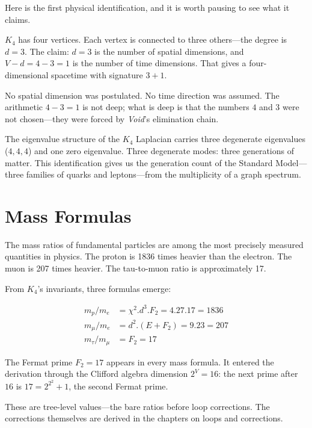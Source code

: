 \documentclass[11pt,a4paper]{book}
\def\cdot{.}%
\newcommand{\VoidRef}[2]{\textit{#2} (in \textit{Void})}
\begin{document}
Here is the first physical identification, and it is worth pausing to see what it claims.

$K_4$ has four vertices. Each vertex is connected to three others---the degree is $d = 3$. The claim: $d = 3$ is the number of spatial dimensions, and $V - d = 4 - 3 = 1$ is the number of time dimensions. That gives a four-dimensional spacetime with signature $3 + 1$.

No spatial dimension was postulated. No time direction was assumed. The arithmetic $4 - 3 = 1$ is not deep; what is deep is that the numbers $4$ and $3$ were not chosen---they were forced by \textit{Void}'s elimination chain.%

The eigenvalue structure of the $K_4$ Laplacian carries three degenerate eigenvalues ($4, 4, 4$) and one zero eigenvalue. Three degenerate modes: three generations of matter. This identification gives us the generation count of the Standard Model---three families of quarks and leptons---from the multiplicity of a graph spectrum.

\section{Mass Formulas}

The mass ratios of fundamental particles are among the most precisely measured quantities in physics. The proton is 1836 times heavier than the electron. The muon is 207 times heavier. The tau-to-muon ratio is approximately 17.

From $K_4$'s invariants, three formulas emerge:

\begin{align}
m_p / m_e &= \chi^2 \cdot d^3 \cdot F_2 = 4 \cdot 27 \cdot 17 = 1836 \\
m_\mu / m_e &= d^2 \cdot (E + F_2) = 9 \cdot 23 = 207 \\
m_\tau / m_\mu &= F_2 = 17
\end{align}

The Fermat prime $F_2 = 17$ appears in every mass formula. It entered the derivation through the Clifford algebra dimension $2^V = 16$: the next prime after $16$ is $17 = 2^{2^2} + 1$, the second Fermat prime.%

These are tree-level values---the bare ratios before loop corrections. The corrections themselves are derived in the chapters on loops and corrections.
\end{document}
